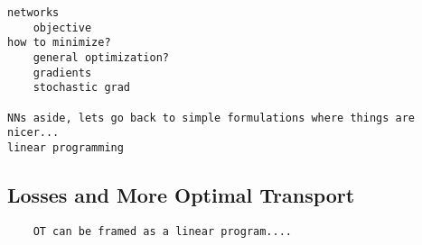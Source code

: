 \begin{verbatim}
networks
    objective
how to minimize?
    general optimization?
    gradients
    stochastic grad

NNs aside, lets go back to simple formulations where things are nicer...
linear programming
\end{verbatim}

\subsection{Losses and More Optimal Transport}
\begin{verbatim}
    OT can be framed as a linear program....
\end{verbatim}
    
